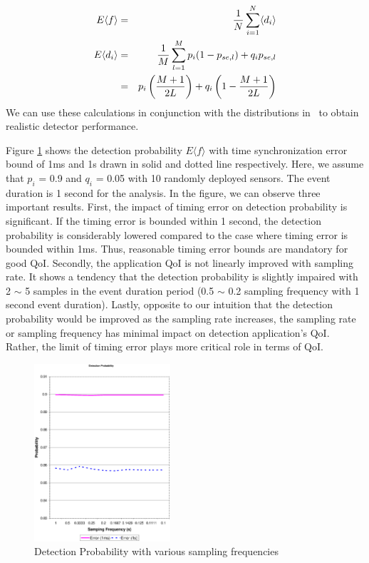 \begin{eqnarray}
  E\langle f\rangle &=& {1\over N}\sum_{i=1}^N\langle d_i \rangle\nonumber\\
  E\langle d_i \rangle&=& {1\over M}\sum_{l=1}^M p_i(1-p_{se,l})+q_ip_{se,l}\nonumber\\
  &=& p_i\left( {M+1 \over 2L}\right)+q_i\left(1- {M+1 \over 2L}\right)\label{eqn:heterog_detector_mean}
\end{eqnarray}
We can use these calculations in conjunction with the distributions in~\cite{timing-error} to obtain realistic detector performance.

Figure \ref{fig:detection} shows the detection probability $E\langle
f\rangle$ with time synchronization error bound of 1ms and 1s drawn
in solid and dotted line respectively. Here, we assume that $p_i$ =
0.9 and $q_i$ = 0.05 with 10 randomly deployed sensors. The event
duration is 1 second for the analysis. In the figure, we can observe
three important results. First, the impact of timing error on
detection probability is significant. If the timing error is bounded
within 1 second, the detection probability is considerably lowered
compared to the case where timing error is bounded within 1ms. Thus,
reasonable timing error bounds are mandatory for good QoI. Secondly,
the application QoI is not linearly improved with sampling rate. It
shows a tendency that the detection probability is slightly impaired
with 2 $\sim$ 5 samples in the event duration period (0.5 $\sim$ 0.2
sampling frequency with 1 second event duration). Lastly, opposite
to our intuition that the detection probability would be improved as
the sampling rate increases, the sampling rate or sampling frequency
has minimal impact on detection application's QoI. Rather, the limit
of timing error plays more critical role in terms of QoI.

\begin{figure}
    \begin{center}

    \includegraphics[height=0.3\textheight,width=0.45\textwidth,bbllx=49,bblly=101,bburx=585,bbury=714]{figures/detectionfig}
    \caption{Detection Probability with various sampling frequencies}
        \label{fig:detection}
    \end{center}
\end{figure}
